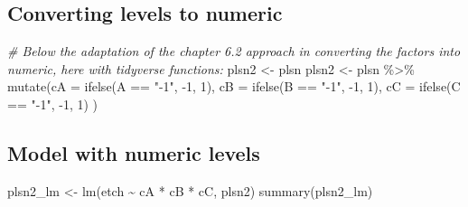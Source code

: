 \documentclass[
]{book}
\newenvironment{Shaded}{\begin{snugshade}}{\end{snugshade}}
\newcommand{\AttributeTok}[1]{\textcolor[rgb]{0.77,0.63,0.00}{#1}}
\newcommand{\CommentTok}[1]{\textcolor[rgb]{0.56,0.35,0.01}{\textit{#1}}}
\newcommand{\DecValTok}[1]{\textcolor[rgb]{0.00,0.00,0.81}{#1}}
\newcommand{\FunctionTok}[1]{\textcolor[rgb]{0.00,0.00,0.00}{#1}}
\newcommand{\NormalTok}[1]{#1}
\newcommand{\OtherTok}[1]{\textcolor[rgb]{0.56,0.35,0.01}{#1}}
\newcommand{\SpecialCharTok}[1]{\textcolor[rgb]{0.00,0.00,0.00}{#1}}
\newcommand{\StringTok}[1]{\textcolor[rgb]{0.31,0.60,0.02}{#1}}
\begin{document}
\hypertarget{converting-levels-to-numeric}{%
\subsection{Converting levels to numeric}\label{converting-levels-to-numeric}}

\begin{Shaded}
\begin{Highlighting}[]
\CommentTok{\# Below the adaptation of the chapter 6.2 approach in converting the factors into numeric, here with tidyverse functions:}
\NormalTok{plsn2 }\OtherTok{\textless{}{-}}\NormalTok{ plsn}
\NormalTok{plsn2 }\OtherTok{\textless{}{-}}\NormalTok{ plsn }\SpecialCharTok{\%\textgreater{}\%} \FunctionTok{mutate}\NormalTok{(}\AttributeTok{cA =} \FunctionTok{ifelse}\NormalTok{(A }\SpecialCharTok{==} \StringTok{"{-}1"}\NormalTok{, }\SpecialCharTok{{-}}\DecValTok{1}\NormalTok{, }\DecValTok{1}\NormalTok{),}
                         \AttributeTok{cB =} \FunctionTok{ifelse}\NormalTok{(B }\SpecialCharTok{==} \StringTok{"{-}1"}\NormalTok{, }\SpecialCharTok{{-}}\DecValTok{1}\NormalTok{, }\DecValTok{1}\NormalTok{),}
                         \AttributeTok{cC =} \FunctionTok{ifelse}\NormalTok{(C }\SpecialCharTok{==} \StringTok{"{-}1"}\NormalTok{, }\SpecialCharTok{{-}}\DecValTok{1}\NormalTok{, }\DecValTok{1}\NormalTok{)}
\NormalTok{                         )}
\end{Highlighting}
\end{Shaded}

\hypertarget{model-with-numeric-levels}{%
\subsection{Model with numeric levels}\label{model-with-numeric-levels}}

\begin{Shaded}
\begin{Highlighting}[]
\NormalTok{plsn2\_lm }\OtherTok{\textless{}{-}} \FunctionTok{lm}\NormalTok{(etch }\SpecialCharTok{\textasciitilde{}}\NormalTok{ cA }\SpecialCharTok{*}\NormalTok{ cB }\SpecialCharTok{*}\NormalTok{ cC, plsn2)}
\FunctionTok{summary}\NormalTok{(plsn2\_lm)}
\end{Highlighting}
\end{Shaded}
\end{document}
